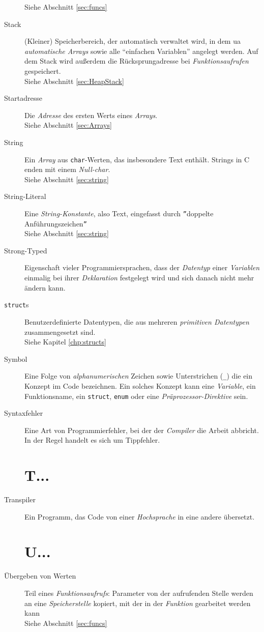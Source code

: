 \begin{appendices}
\begin{description}
	Siehe Abschnitt \ref{sec:funcs}
\item[Stack] (Kleiner) Speicherbereich, der automatisch verwaltet wird, \ie in dem ua
	\emph{automatische Arrays} sowie alle \enquote{einfachen Variablen} angelegt werden. Auf dem Stack
	wird außerdem die Rücksprungadresse bei \emph{Funktionsaufrufen} gespeichert.\\
	Siehe Abschnitt \ref{sec:HeapStack}
\item[Startadresse] Die \emph{Adresse} des ersten Werts eines \emph{Arrays}.\\
	Siehe Abschnitt \ref{sec:Arrays}
\item[String] Ein \emph{Array} aus \texttt{char}-Werten, das insbesondere Text enthält. Strings
	in C enden mit einem \emph{Null-char}.\\
	Siehe Abschnitt \ref{sec:string}
\item[String-Literal] Eine \emph{String-Konstante}, also Text, eingefasst durch \texttt{''}doppelte
	Anführungszeichen\texttt{''}\\
	Siehe Abschnitt \ref{sec:string}
\item[Strong-Typed] Eigenschaft vieler Programmiersprachen, dass der \emph{Datentyp} einer
	\emph{Variablen} einmalig bei ihrer \emph{Deklaration} festgelegt wird und sich danach nicht mehr
	ändern kann.
\item[\texttt{struct}s] Benutzerdefinierte Datentypen, die aus mehreren 
	\emph{primitiven Datentypen} zusammengesetzt sind.\\
	Siehe Kapitel \ref{chp:structs}
\item[Symbol] Eine Folge von \emph{alphanumerischen} Zeichen sowie Unterstrichen (\texttt{\_}) die
	ein Konzept im Code bezeichnen. Ein solches Konzept kann \eg eine \emph{Variable}, ein
	Funktionsname, ein \texttt{struct}, \texttt{enum} oder eine 
	\emph{Präprozessor-Direktive} sein.
\item[Syntaxfehler] Eine Art von Programmierfehler, bei der der \emph{Compiler} die Arbeit abbricht. In
	der Regel handelt es sich um Tippfehler.

\section*{T...}
\item[Transpiler] Ein Programm, das Code von einer \emph{Hochsprache} in eine andere übersetzt.

\section*{U...}
\item[Übergeben von Werten] Teil eines \emph{Funktionsaufrufs}: Parameter von der aufrufenden Stelle
	werden an eine \emph{Speicherstelle} kopiert, mit der in der \emph{Funktion} gearbeitet werden kann
	\\
	Siehe Abschnitt \ref{sec:funcs}
	

\end{description}
\end{appendices}
